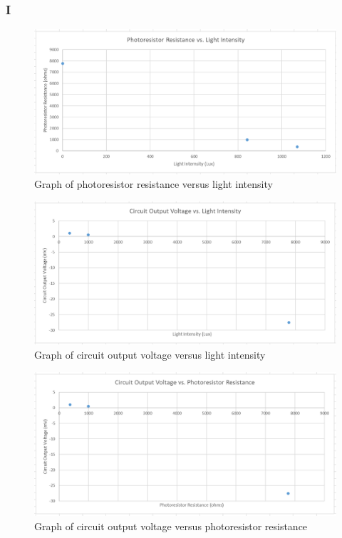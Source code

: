 \documentclass[10pt]{article}
\begin{document}
\subsubsection*{I}
\begin{figure}[H]
	\centering
	\includegraphics[width=\textwidth]{LSA}
	\caption{Graph of photoresistor resistance versus light intensity}
\end{figure}
\begin{figure}[H]
	\centering
	\includegraphics[width=\textwidth]{LSB}
	\caption{Graph of circuit output voltage versus light intensity}
\end{figure}
\begin{figure}[H]
	\centering
	\includegraphics[width=\textwidth]{LSC}
	\caption{Graph of circuit output voltage versus photoresistor resistance}
\end{figure}
\end{document}
